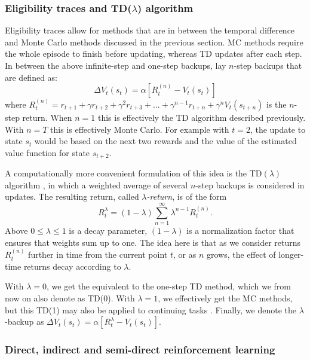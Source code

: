\documentclass{article} %
\begin{document}
\subsubsection{Eligibility traces and TD($\lambda$) algorithm}

Eligibility traces \cite{watkins1989learning} allow for methods that are in
between the temporal difference and Monte Carlo methods discussed in the
previous section. MC methods require the whole episode to finish before
updating, whereas TD updates after each step. In between the above
infinite-step and one-step backups, lay $n$-step backups that are defined as:
\begin{equation}
  \Delta V_t(s_t) = \alpha[R^{(n)}_t - V_t(s_t)]
\end{equation}
where $R^{(n)}_t = r_{t+1} + \gamma r_{t+2} + \gamma^2 r_{t+3} + ... +
\gamma^{n-1} r_{t+n} + \gamma^n V_t(s_{t+n})$ is the $n$-step return. When $n =
1$ this is effectively the TD algorithm described previously. With $n = T$ this
is effectively Monte Carlo. For example with $t=2$, the update to state $s_t$
would be based on the next two rewards and the value of the estimated value
function for state $s_{t+2}$.

A computationally more convenient formulation of this idea is the TD$(\lambda)$
algorithm \cite{sutton1988learning}, in which a weighted average of several
$n$-step backups is considered in updates. The resulting return, called
\emph{$\lambda$-return}, is of the form
\begin{equation}
  R^{\lambda}_t = (1 - \lambda) \sum_{n=1}^{\infty} \lambda^{n-1} R^{(n)}_t.
\end{equation}
Above $0 \leq \lambda \leq 1$ is a decay parameter, $(1-\lambda)$ is a
normalization factor that ensures that weights sum up to one. The idea here is
that as we consider returns $R^{(n)}_t$ further in time from the current point
$t$, or as $n$ grows, the effect of longer-time returns decay according to
$\lambda$.

With $\lambda = 0$, we get the equivalent to the one-step TD method, which we
from now on also denote as TD(0). With $\lambda = 1$, we effectively get the MC
methods, but this TD(1) may also be applied to continuing tasks \cite{book}.
Finally, we denote the $\lambda$-backup as $\Delta V_t(s_t) =
\alpha[R^{\lambda}_t - V_t(s_t)]$.



\subsubsection{Direct, indirect and semi-direct reinforcement learning}
\end{document}
